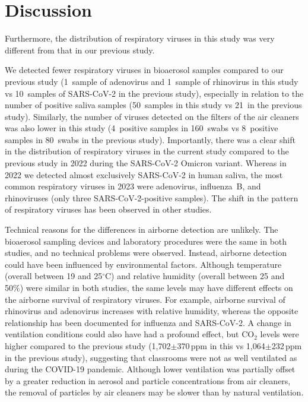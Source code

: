 \section{Discussion}

Furthermore, the distribution of respiratory viruses in this study was very different from that in our previous study. 


We detected fewer respiratory viruses in bioaerosol samples compared to our previous study\cite{Banholzer2023PLoSMed} (1~sample of adenovirus and 1~sample of rhinovirus in this study vs 10~samples of SARS-CoV-2 in the previous study), especially in relation to the number of positive saliva samples (50~samples in this study vs 21~in the previous study). Similarly, the number of viruses detected on the filters of the air cleaners was also lower in this study (4~positive samples in 160~swabs vs 8~positive samples in 80~swabs in the previous study). Importantly, there was a clear shift in the distribution of respiratory viruses in the current study compared to the previous study in 2022 during the SARS-CoV-2 Omicron variant. Whereas in 2022 we detected almost exclusively SARS-CoV-2 in human saliva, the most common respiratory viruses in 2023 were adenovirus, influenza~B, and rhinoviruses (only three SARS-CoV-2-positive samples). The shift in the pattern of respiratory viruses has been observed in other studies\cite{Nygaard2023Lancet,Sauteur2022EuroSurv}. 


Technical reasons for the differences in airborne detection are unlikely. The bioaerosol sampling devices and laboratory procedures were the same in both studies, and no technical problems were observed. Instead, airborne detection could have been influenced by environmental factors. Although temperature (overall between 19 and 25$^{\circ}$C) and relative humidity (overall between 25 and 50\%) were similar in both studies, the same levels may have different effects on the airborne survival of respiratory viruses. For example, airborne survival of rhinovirus and adenovirus increases with relative humidity, whereas the opposite relationship has been documented for influenza and SARS-CoV-2\cite{Tellier2009JTRSI,Ahlawat2020AAQR,Biryukov2020mS,Karim1985CJM,Davis1971AM}. A change in ventilation conditions could also have had a profound effect, but CO$_2$ levels were higher compared to the previous study (1,702$\pm$370\,ppm in this vs 1,064$\pm$232\,ppm in the previous study), suggesting that classrooms were not as well ventilated as during the COVID-19 pandemic. Although lower ventilation was partially offset by a greater reduction in aerosol and particle concentrations from air cleaners, the removal of particles by air cleaners may be slower than by natural ventilation.

